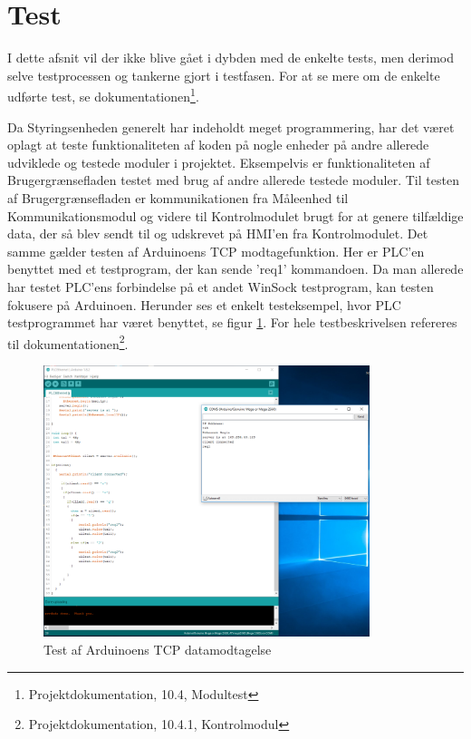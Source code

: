 
\section{Test}

I dette afsnit vil der ikke blive gået i dybden med de enkelte tests, men derimod selve testprocessen og tankerne gjort i testfasen. For at se mere om de enkelte udførte test, se dokumentationen\footnote{Projektdokumentation, 10.4, Modultest}.

Da Styringsenheden generelt har indeholdt meget programmering, har det været oplagt at teste funktionaliteten af koden på nogle enheder på andre allerede udviklede og testede moduler i projektet.  Eksempelvis er funktionaliteten af Brugergrænsefladen testet med brug af andre allerede testede moduler. Til testen af Brugergrænsefladen er kommunikationen fra Måleenhed til Kommunikationsmodul og videre til Kontrolmodulet brugt for at genere tilfældige data, der så blev sendt til og udskrevet på HMI'en fra Kontrolmodulet. Det samme gælder testen af Arduinoens TCP modtagefunktion. Her er PLC'en benyttet  med et testprogram, der kan sende 'req1' kommandoen. Da man allerede har testet PLC'ens forbindelse på et andet WinSock testprogram\cite{WinSock}, kan testen fokusere på Arduinoen. Herunder ses et enkelt testeksempel, hvor PLC testprogrammet har været benyttet, se figur \ref{fig:EthernetTest}. For hele testbeskrivelsen refereres til dokumentationen\footnote{Projektdokumentation, 10.4.1, Kontrolmodul}.


\begin{figure}[H] %
	\centering
	\includegraphics[width=0.85\textwidth]{figure/EthernetTest}
	\caption{Test af Arduinoens TCP datamodtagelse}
	\label{fig:EthernetTest}
\end{figure}